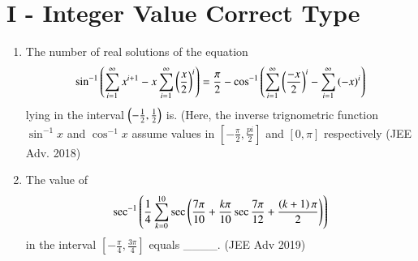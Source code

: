 \documentclass[journal,12pt,twocolumn]{IEEEtran}
\theoremstyle{remark}
\begin{document}
\twocolumn
\section*{I - Integer Value Correct Type}
\begin{enumerate}
	\item{
		The number of real solutions of the equation $$\sin ^{-1}\left(\sum_{i=1}^{\infty} x^{i+1}-x \sum_{i=1}^{\infty} \left(\frac{x}{2}\right)^i\right) = \frac{\pi}{2} - \cos^{-1}\left(\sum_{i=1}^{\infty}\left(\frac{-x}{2}\right)^i-\sum_{i=1}^{\infty} \left(-x\right)^i\right)$$ lying in the interval $\left(-\frac{1}{2},\frac{1}{2}\right)$ is. (Here, the inverse trignometric function $\sin^{-1}x$ and $\cos^{-1}x$ assume values in $[-\frac{\pi}{2}, \frac{pi}{2}]$ and $[0, \pi]$ respectively \hfill (JEE Adv. 2018)
}
\\
\item{
		The value of $$\sec^{-1}\left(\frac{1}{4}\sum_{k=0}^{10} \sec\left(\frac{7\pi}{10}+\frac{k\pi}{10} \sec{\frac{7\pi}{12}+\frac{\ensuremath{\left(k+1\right)}\pi}{2}}\right)\right)$$ in the interval $[-\frac{\pi}{4},\frac{3\pi}{4}]$ equals \_\_\_\_. \hfill (JEE Adv 2019)	
	}
\end{enumerate}

\twocolumn
\end{document}
